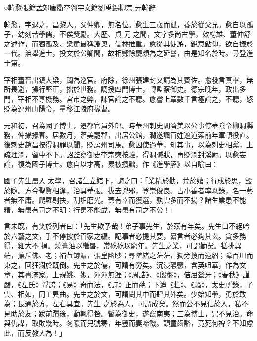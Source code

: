 
\begin{pinyinscope}

 ○韓愈張籍孟郊唐衢李翱宇文籍劉禹錫柳宗
 元韓辭



 韓愈，字退之，昌黎人。父仲卿，無名位。愈生三歲而孤，養於從父兄。愈自以孤子，幼刻苦學儒，不俟獎勵。大歷、貞
 元
 之間，文字多尚古學，效楊雄、董仲舒之述作，而獨孤及、梁肅最稱淵奧，儒林推重。愈從其徒游，銳意鉆仰，欲自振於一代。洎舉進士，投文於公卿間，故相鄭餘慶頗為之延譽，由是知名於時。尋登進士第。



 宰相董晉出鎮大梁，闢為巡官。府除，徐州張建封又請為其賓佐。愈發言真率，無所畏避，操行堅正，拙於世務。調授四門博士，轉監察御史。德宗晚年，政出多門，宰相不專機務。宮市之弊，諫官論之不聽。愈嘗上章數千言極論之，不聽，怒
 貶為連州山陽令，量移江陵府掾曹。



 元和初，召為國子博士，遷都官員外郎。時華州刺史閻濟美以公事停華陰令柳澗縣務，俾攝掾曹。居數月，濟美罷郡，出居公館，澗遂諷百姓遮道索前年軍頓役直。後刺史趙昌按得澗罪以聞，貶房州司馬。愈因使過華，知其事，以為刺史相黨，上疏理澗，留中不下。詔監察御史李宗奭按驗，得澗贓狀，再貶澗封溪尉。以愈妄論，復為國子博士。愈自以才高，累被擯黜，作《進學解》以自喻曰：



 國子先生晨入
 太學，召諸生立館下，誨之曰：「業精於勤，荒於嬉；行成於思，毀於隨。方今聖賢相逢，治具華張。拔去兇邪，登崇俊良。占小善者率以錄，名一藝者無不庸。爬羅剔抉，刮垢磨光。蓋有幸而獲選，孰雲多而不揚？諸生業患不能精，無患有司之不明；行患不能成，無患有司之不公！」



 言未既，有笑於列者曰：「先生欺予哉！弟子事先生，於茲有年矣。先生口不絕吟於六藝之文，手不停披於百家之編。記事者必提其要，纂言者必鉤其玄。貪多務得，細大不
 捐。燒膏油以繼晷，常矻矻以窮年。先生之業，可謂勤矣。牴排異端，攘斥佛、老；補苴罅漏，張皇幽眇；尋墜緒之茫茫，獨旁搜而遠紹；障百川而東之，回狂瀾於既倒。先生之於儒，可謂有勞矣。沉浸醲鬱，含英咀華，作為文章，其書滿家。上規姚、姒，渾渾無涯；《周誥》、《殷盤》，佶屈聱牙；《春秋》謹嚴，《左氏》浮誇；《易》奇而法，《詩》正而葩；下迨《莊》、《騷》，太史所錄，子雲、相如，同工異曲。先生之於文，可謂閎其中而肆其外矣。少始知學，勇於敢為；長通於方，左右具宜。先生
 之於為人，可謂成矣。然而公不見信於人，私不見助於友；跋前躓後，動輒得咎。暫為御史，遂竄南夷；三為博士，冗不見治。命與仇謀，取敗幾時。冬暖而兒號寒，年豐而妻啼饑。頭童齒豁，竟死何裨？不知慮此，而反教人為！」




\end{pinyinscope}
